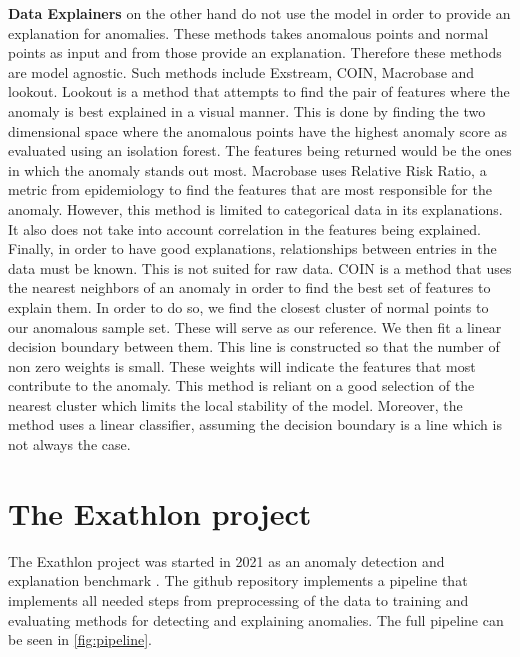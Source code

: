 \documentclass[oneside, a4paper, onecolumn, 11pt]{article}
\begin{document}
\textbf{Data Explainers} on the other hand do not use the model in order to provide an explanation for anomalies. These methods takes anomalous points and normal points as input and from those provide an explanation. Therefore these methods are model agnostic. Such methods include Exstream, COIN, Macrobase and lookout. Lookout \cite{lookout} is a method that attempts to find the pair of features where the anomaly is best explained in a visual manner. This is done by finding the two dimensional space where the anomalous points have the highest anomaly score as evaluated using an isolation forest. The features being returned would be the ones in which the anomaly stands out most. Macrobase \cite{macrobase} uses Relative Risk Ratio, a metric from epidemiology to find the features that are most responsible for the anomaly. However, this method is limited to categorical data in its explanations. It also does not take into account correlation in the features being explained. Finally, in order to have good explanations, relationships between entries in the data must be known. This is not suited for raw data. COIN \cite{coin} is a method that uses the nearest neighbors of an anomaly in order to find the best set of features to explain them. In order to do so, we find the closest cluster of normal points to our anomalous sample set. These will serve as our reference. We then fit a linear decision boundary between them. This line is constructed so that the number of non zero weights is small. These weights will indicate the features that most contribute to the anomaly. This method is reliant on a good selection of the nearest cluster which limits the local stability of the model. Moreover, the method uses a linear classifier, assuming the decision boundary is a line which is not always the case.\\
\section{The Exathlon project}
The Exathlon project was started in 2021 as an anomaly detection and explanation benchmark \cite{Exathlon}. The github repository implements a pipeline that implements all needed steps from preprocessing of the data to training and evaluating methods for detecting and explaining anomalies. The full pipeline can be seen in \autoref{fig:pipeline}.
\end{document}

